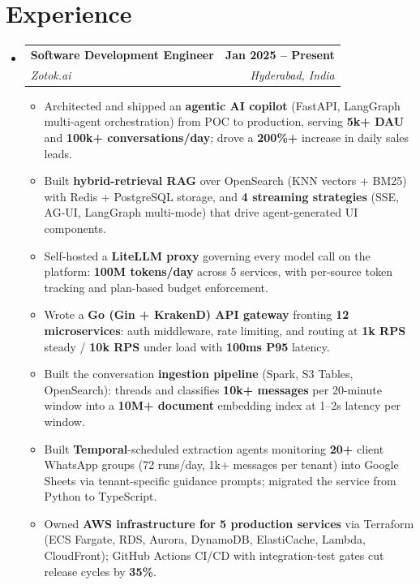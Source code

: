 \documentclass[letterpaper,10pt]{article}
\makeatletter
\newcommand{\resumeItem}[1]{\item\small{#1}}
\newcommand{\resumeSubheading}[4]{
\item
\begin{tabular*}{\textwidth}{l@{\extracolsep{\fill}}r}
\textbf{#1} & \textbf{\small #2} \\
\textit{\small #3} & \textit{\small #4}
\end{tabular*}\vspace{-4pt}
}
\newcommand{\resumeItemListStart}{\begin{itemize}[leftmargin=*,itemsep=3pt,parsep=1pt]}
\newcommand{\resumeItemListEnd}{\end{itemize}\vspace{-5pt}}
\makeatother
\begin{document}
\vspace{4pt plus 1fill}
\section{Experience}
\begin{itemize}[leftmargin=0pt, label={}]
\resumeSubheading
{Software Development Engineer}{Jan 2025 -- Present}
{Zotok.ai}{Hyderabad, India}

\vspace*{6pt}
\resumeItemListStart

\resumeItem{Architected and shipped an \textbf{agentic AI copilot} (FastAPI, LangGraph multi-agent orchestration) from POC to production, serving \textbf{5k+ DAU} and \textbf{100k+ conversations/day}; drove a \textbf{200\%+} increase in daily sales leads.}

\resumeItem{Built \textbf{hybrid-retrieval RAG} over OpenSearch (KNN vectors + BM25) with Redis + PostgreSQL storage, and \textbf{4 streaming strategies} (SSE, AG-UI, LangGraph multi-mode) that drive agent-generated UI components.}

\resumeItem{Self-hosted a \textbf{LiteLLM proxy} governing every model call on the platform: \textbf{100M tokens/day} across 5 services, with per-source token tracking and plan-based budget enforcement.}

\resumeItem{Wrote a \textbf{Go (Gin + KrakenD) API gateway} fronting \textbf{12 microservices}: auth middleware, rate limiting, and routing at \textbf{1k RPS} steady / \textbf{10k RPS} under load with \textbf{100ms P95} latency.}

\resumeItem{Built the conversation \textbf{ingestion pipeline} (Spark, S3 Tables, OpenSearch): threads and classifies \textbf{10k+ messages} per 20-minute window into a \textbf{10M+ document} embedding index at 1--2s latency per window.}

\resumeItem{Built \textbf{Temporal}-scheduled extraction agents monitoring \textbf{20+} client WhatsApp groups (72 runs/day, 1k+ messages per tenant) into Google Sheets via tenant-specific guidance prompts; migrated the service from Python to TypeScript.}

\resumeItem{Owned \textbf{AWS infrastructure for 5 production services} via Terraform (ECS Fargate, RDS, Aurora, DynamoDB, ElastiCache, Lambda, CloudFront); GitHub Actions CI/CD with integration-test gates cut release cycles by \textbf{35\%}.}

\resumeItemListEnd
\end{itemize}
\end{document}

